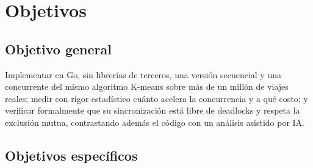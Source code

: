 \section{Objetivos}

\subsection{Objetivo general}

Implementar en Go, sin librerías de terceros, una versión secuencial y una concurrente del mismo
algoritmo K-means sobre más de un millón de viajes reales; medir con rigor estadístico cuánto
acelera la concurrencia y a qué costo; y verificar formalmente que su sincronización está libre de
deadlocks y respeta la exclusión mutua, contrastando además el código con un análisis asistido por
IA.

\subsection{Objetivos específicos}

